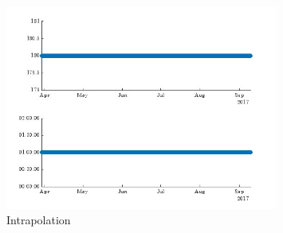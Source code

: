 \documentclass{article}
\begin{document}
\begin{figure}[ht] 
  \centering
  \includegraphics[width=0.8\textwidth]{Intrapolation_1.jpg}
  \caption{Intrapolation}
  \label{fig:Intrapolation}
\end{figure}
\end{document}
